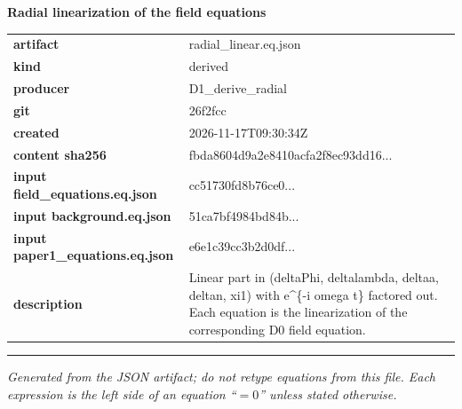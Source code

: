 \documentclass[10pt,a4paper]{article}
\begin{document}
{\Large\bfseries Radial linearization of the field equations}\par
\smallskip
\begin{tabular}{@{}lp{}@{}}\textbf{artifact} & radial\_linear.eq.json\\\textbf{kind} & derived\\\textbf{producer} & D1\_derive\_radial\\\textbf{git} & 26f2fcc\\\textbf{created} & 2026-11-17T09:30:34Z\\\textbf{content sha256} & fbda8604d9a2e8410acfa2f8ec93dd16...\\\textbf{input field\_equations.eq.json} & cc51730fd8b76ce0...\\\textbf{input background.eq.json} & 51ca7bf4984bd84b...\\\textbf{input paper1\_equations.eq.json} & e6e1c39cc3b2d0df...\\\textbf{description} & Linear part in (deltaPhi, deltalambda, deltaa, deltan, xi1) with e\textasciicircum{}\{-i omega t\} factored out. Each equation is the linearization of the corresponding D0 field equation.\\\end{tabular}
\par\medskip\hrule\medskip

\textit{Generated from the JSON artifact; do not retype equations from this file. Each expression is the left side of an equation ``$= 0$'' unless stated otherwise.}\par
\end{document}
